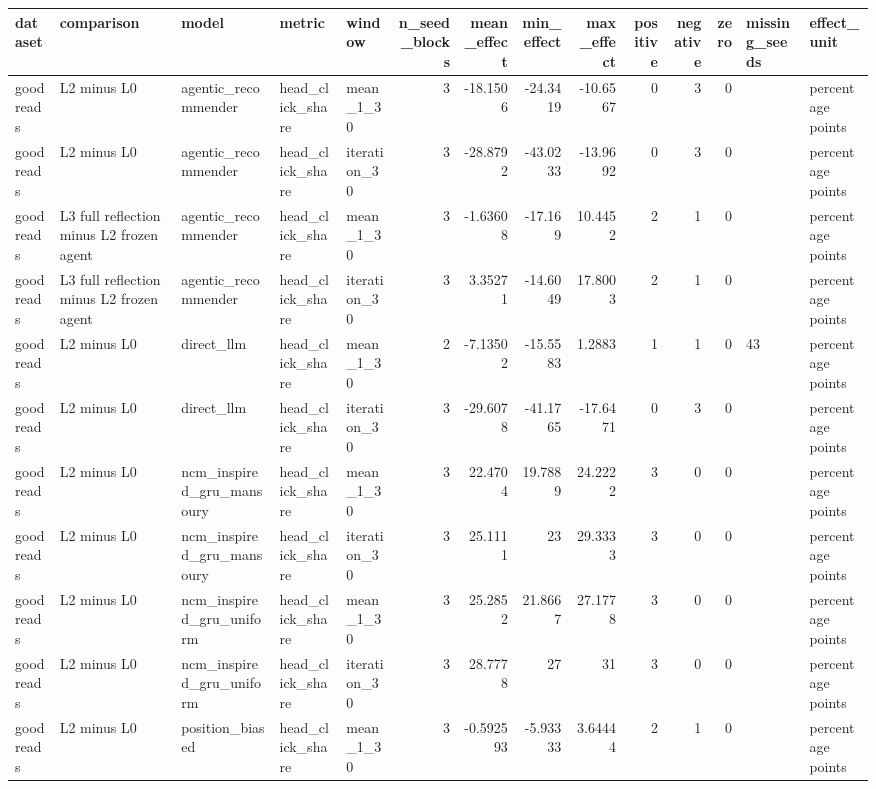 \begin{table}[htbp!]
\centering
\small
\setlength{\tabcolsep}{3pt}
\renewcommand{\arraystretch}{1.1}
\begin{tabular}{lllllrrrrrrrll}
\hline
dataset & comparison & model & metric & window & n\_seed\_blocks & mean\_effect & min\_effect & max\_effect & positive & negative & zero & missing\_seeds & effect\_unit \\
\hline
goodreads & L2 minus L0 & agentic\_recommender & head\_click\_share & mean\_1\_30 & 3 & -18.1506 & -24.3419 & -10.6567 & 0 & 3 & 0 &  & percentage points \\
goodreads & L2 minus L0 & agentic\_recommender & head\_click\_share & iteration\_30 & 3 & -28.8792 & -43.0233 & -13.9692 & 0 & 3 & 0 &  & percentage points \\
goodreads & L3 full reflection minus L2 frozen agent & agentic\_recommender & head\_click\_share & mean\_1\_30 & 3 & -1.63608 & -17.169 & 10.4452 & 2 & 1 & 0 &  & percentage points \\
goodreads & L3 full reflection minus L2 frozen agent & agentic\_recommender & head\_click\_share & iteration\_30 & 3 & 3.35271 & -14.6049 & 17.8003 & 2 & 1 & 0 &  & percentage points \\
goodreads & L2 minus L0 & direct\_llm & head\_click\_share & mean\_1\_30 & 2 & -7.13502 & -15.5583 & 1.2883 & 1 & 1 & 0 & 43 & percentage points \\
goodreads & L2 minus L0 & direct\_llm & head\_click\_share & iteration\_30 & 3 & -29.6078 & -41.1765 & -17.6471 & 0 & 3 & 0 &  & percentage points \\
goodreads & L2 minus L0 & ncm\_inspired\_gru\_mansoury & head\_click\_share & mean\_1\_30 & 3 & 22.4704 & 19.7889 & 24.2222 & 3 & 0 & 0 &  & percentage points \\
goodreads & L2 minus L0 & ncm\_inspired\_gru\_mansoury & head\_click\_share & iteration\_30 & 3 & 25.1111 & 23 & 29.3333 & 3 & 0 & 0 &  & percentage points \\
goodreads & L2 minus L0 & ncm\_inspired\_gru\_uniform & head\_click\_share & mean\_1\_30 & 3 & 25.2852 & 21.8667 & 27.1778 & 3 & 0 & 0 &  & percentage points \\
goodreads & L2 minus L0 & ncm\_inspired\_gru\_uniform & head\_click\_share & iteration\_30 & 3 & 28.7778 & 27 & 31 & 3 & 0 & 0 &  & percentage points \\
goodreads & L2 minus L0 & position\_biased & head\_click\_share & mean\_1\_30 & 3 & -0.592593 & -5.93333 & 3.64444 & 2 & 1 & 0 &  & percentage points \\

\end{tabular}
\end{table}
